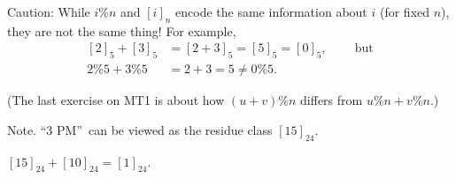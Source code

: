 \documentclass[numbers=enddot,12pt,final,onecolumn,notitlepage]{scrartcl}%
\newcounter{exer}
\numberwithin{exer}{subsection}
\theoremstyle{definition}
\begin{document}
Caution: While $i\%n$ and $\left[  i\right]  _{n}$ encode the same information
about $i$ (for fixed $n$), they are not the same thing! For example,%
\begin{align*}
\left[  2\right]  _{5}+\left[  3\right]  _{5}  & =\left[  2+3\right]
_{5}=\left[  5\right]  _{5}=\left[  0\right]  _{5}%
,\ \ \ \ \ \ \ \ \ \ \text{but}\\
2\%5+3\%5  & =2+3=5\neq0\%5.
\end{align*}


(The last exercise on MT1 is about how $\left(  u+v\right)  \%n$ differs from
$u\%n+v\%n$.)

Note. \textquotedblleft3 PM\textquotedblright\ can be viewed as the residue
class $\left[  15\right]  _{24}$.

$\left[  15\right]  _{24}+\left[  10\right]  _{24}=\left[  1\right]  _{24}$.
\end{document}
